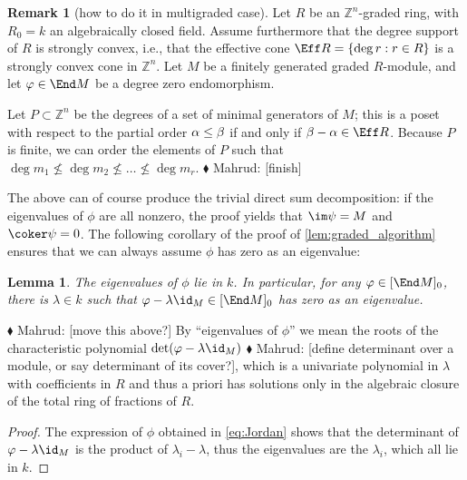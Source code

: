 \documentclass[12pt]{article}
\let\b\beta
\def\ZZ{\mathbb Z}
\theoremstyle{theorem}
\numberwithin{thm}{section}
\newtheorem{lem}[thm]{Lemma}
\theoremstyle{definition}
\newtheorem{rem}[thm]{Remark}
\newcommand{\mahrud}[1]{{\color{ForestGreen} \sf $\blacklozenge$ Mahrud: [#1]}}
\begin{document}
\begin{rem}[how to do it in multigraded case]
  Let $R$ be an $\ZZ^n$-graded ring, with $R_0=k$ an algebraically closed field.
  Assume furthermore that the degree support of $R$ is strongly convex, i.e., that
  the effective cone
  $\Eff R = \{ \deg r : r\in R\}$ is a strongly convex cone in $\ZZ^n$.
  Let $M$ be a finitely generated graded $R$-module, and let $\phi \in \End M$ be a degree zero endomorphism.

  Let $P\subset \ZZ^n$ be the degrees of a set of minimal generators of $M$;
  this is a poset with respect to the partial order $\a\leq \b$ if and only if $\b-\a\in \Eff R$.
  Because $P$ is finite, we can order the elements of $P$ such that
  $\deg m_1\not\leq \deg m_2\not \leq \dots\not\leq \deg m_r$.
  \mahrud{finish}
\end{rem}

The above can of course produce the trivial direct sum decomposition: if the eigenvalues of $\phi$ are all nonzero, the proof yields that $\im \psi = M$ and $\coker \psi = 0$. The following corollary of the proof of \cref{lem:graded_algorithm} ensures that we can always assume $\phi$ has zero as an eigenvalue:

\begin{lem}
  The eigenvalues of $\phi$ lie in $k$. In particular, for any $\phi \in [\End M]_0$, there is $\lambda \in k$ such that $\phi - \lambda \id_M \in [\End M]_0$ has zero as an eigenvalue.
\end{lem}

\mahrud{move this above?}
By ``eigenvalues of $\phi$'' we mean the roots of the characteristic polynomial $\det(\phi - \lambda \id_M)$\mahrud{define determinant over a module, or say determinant of its cover?}, which is a univariate polynomial in $\lambda$ with coefficients in $R$ and thus a priori has solutions only in the algebraic closure of the total ring of fractions of $R$.

\begin{proof}
  The expression of $\phi$ obtained in \cref{eq:Jordan} shows that the determinant of $\phi - \lambda \id_M$ is the product of $\lambda_i - \lambda$, thus the eigenvalues are the $\lambda_i$, which all lie in $k$.
\end{proof}
\end{document}
